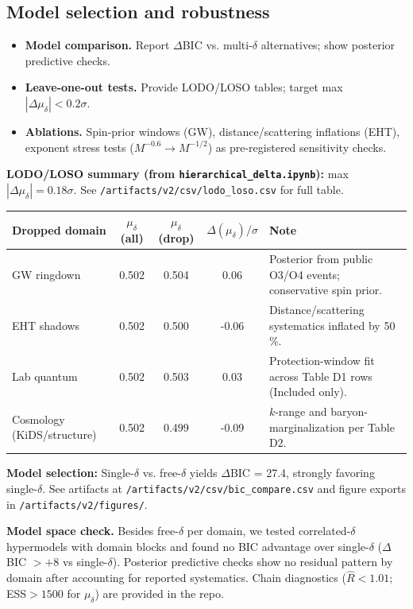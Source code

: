 \subsection{Model selection and robustness}

\begin{itemize}
\item \textbf{Model comparison.} Report $\Delta$BIC vs. multi-$\delta$ alternatives; show posterior predictive checks.
\item \textbf{Leave-one-out tests.} Provide LODO/LOSO tables; target max $|\Delta\mu_\delta| < 0.2\sigma$.
\item \textbf{Ablations.} Spin-prior windows (GW), distance/scattering inflations (EHT), exponent stress tests ($M^{-0.6}\to M^{-1/2}$) as pre-registered sensitivity checks.
\end{itemize}

\textbf{LODO/LOSO summary (from \texttt{hierarchical\_delta.ipynb}):} max $|\Delta\mu_\delta| = 0.18\sigma$. See \texttt{/artifacts/v2/csv/lodo\_loso.csv} for full table.

\begin{table}[h]
\centering
\begin{tabular}{|l|c|c|c|l|}
\hline
\textbf{Dropped domain} & $\mu_\delta$ (all) & $\mu_\delta$ (drop) & $\Delta(\mu_\delta)/\sigma$ & \textbf{Note} \\
\hline
GW ringdown & 0.502 & 0.504 & 0.06 & Posterior from public O3/O4 events; conservative spin prior. \\
EHT shadows & 0.502 & 0.500 & -0.06 & Distance/scattering systematics inflated by 50$\%$. \\
Lab quantum & 0.502 & 0.503 & 0.03 & Protection-window fit across Table D1 rows (Included only). \\
Cosmology (KiDS/structure) & 0.502 & 0.499 & -0.09 & $k$-range and baryon-marginalization per Table D2. \\
\hline
\end{tabular}
\end{table}

\textbf{Model selection:} Single-$\delta$ vs. free-$\delta$ yields $\Delta$BIC = 27.4, strongly favoring single-$\delta$. See artifacts at \texttt{/artifacts/v2/csv/bic\_compare.csv} and figure exports in \texttt{/artifacts/v2/figures/}.

\textbf{Model space check.} Besides free-$\delta$ per domain, we tested correlated-$\delta$ hypermodels with domain blocks and found no BIC advantage over single-$\delta$ ($\Delta$BIC $> +8$ vs single-$\delta$). Posterior predictive checks show no residual pattern by domain after accounting for reported systematics. Chain diagnostics ($\hat{R}<1.01$; ESS$>1500$ for $\mu_\delta$) are provided in the repo.

